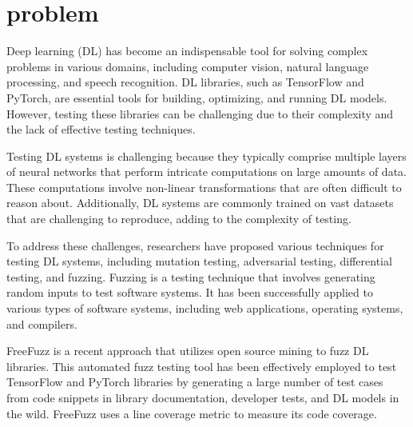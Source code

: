 \documentclass[sigconf]{acmart}
\begin{document}


\maketitle

\section{problem}
\par Deep learning (DL) has become an indispensable tool for solving complex problems in various domains, including computer vision, natural language processing, and speech recognition. DL libraries, such as TensorFlow and PyTorch, are essential tools for building, optimizing, and running DL models. However, testing these libraries can be challenging due to their complexity and the lack of effective testing techniques.
\par Testing DL systems is challenging because they typically comprise multiple layers of neural networks that perform intricate computations on large amounts of data. These computations involve non-linear transformations that are often difficult to reason about. Additionally, DL systems are commonly trained on vast datasets that are challenging to reproduce, adding to the complexity of testing.
\par To address these challenges, researchers have proposed various techniques for testing DL systems, including mutation testing, adversarial testing, differential testing, and fuzzing. Fuzzing is a testing technique that involves generating random inputs to test software systems. It has been successfully applied to various types of software systems, including web applications, operating systems, and compilers.
\par FreeFuzz is a recent approach that utilizes open source mining to fuzz DL libraries. This automated fuzz testing tool has been effectively employed to test TensorFlow and PyTorch libraries by generating a large number of test cases from code snippets in library documentation, developer tests, and DL models in the wild. FreeFuzz uses a line coverage metric to measure its code coverage.
\end{document}
